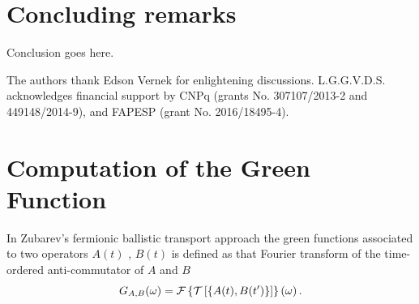 \documentclass[showpacs,aps,prb,reprint,superscriptaddress]{revtex4-1}
\newcommand{\LUIS}[1]{\textcolor{blue}{\fbox{Luis} {\sl#1}}}
\begin{document}
    
\section{Concluding remarks}
\label{sec:Conclusions}

Conclusion goes here.

\begin{acknowledgments}
The authors thank Edson Vernek for enlightening discussions.  L.G.G.V.D.S. acknowledges financial support by CNPq (grants No. 307107/2013-2 and 449148/2014-9), and FAPESP (grant No. 2016/18495-4).
\end{acknowledgments}





%


 \appendix

 
 \section{Computation of the Green Function \label{sec:Appendix_alg}}
 In Zubarev's fermionic ballistic transport approach \cite{zubarev_double-time_1960} the green functions associated to two operators $A(t)$ , $B(t)$ is defined as that Fourier transform of the time-ordered anti-commutator of $A$ and $B$
\begin{equation}
  G_{A,B}(\omega)= \mathcal{F}\left\{ \mathcal{T}\left[\left\{ A(t),B(t')\right\} \right]\right\} \left(\omega\right).
  \label{eq:greenFunction}
\end{equation}
\end{document}
